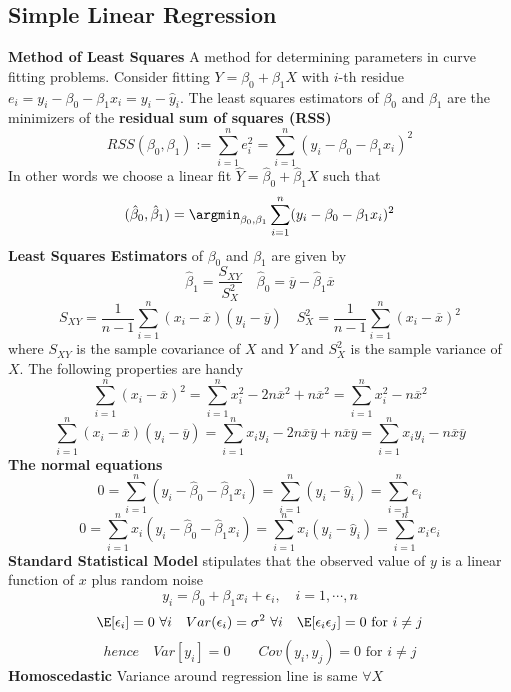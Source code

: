 \documentclass[8pt]{article}
\begin{document}
\begin{multicols}{3}
{   \subsection*{Simple Linear Regression}
   \textbf{Method of Least Squares} A method for determining parameters in curve fitting problems. Consider fitting $Y = \beta_0 + \beta_1 X$ with $i$-th residue $e_i = y_i - \beta_0 - \beta_1 x_i = y_i - \hat{y}_i$. The least squares estimators of $\beta_0$ and $\beta_1$ are the minimizers of the \textbf{residual sum of squares (RSS)}
   \[
     RSS(\beta_0, \beta_1) := \sum_{i=1}^n e_i^2 = \sum_{i=1}^n (y_i - \beta_0 - \beta_1 x_i)^2
    \]
    In other words we choose a linear fit $\hat{Y} = \hat{\beta}_0 + \hat{\beta}_1 X$ such that
    \[
     (\hat{\beta}_0 ,\hat{\beta}_1) = \argmin_{\beta_0, \beta_1} \sum_{i=1}^n (y_i - \beta_0 - \beta_1 x_i)^2
    \]
    \textbf{Least Squares Estimators} of $\beta_0$ and $\beta_1$ are given by
    \[
      \hat{\beta}_1 = \frac{S_{XY}}{S_X^2} \quad \hat{\beta}_0 = \overline{y} - \hat{\beta}_1 \overline{x}
    \]
    \[
      S_{XY} = \frac{1}{n-1} \sum_{i=1}^n (x_i - \overline{x})(y_i - \overline{y}) \quad S_X^2 = \frac{1}{n-1}\sum_{i=1}^{n}(x_i - \overline{x})^2
    \]
    where $S_{XY}$ is the sample covariance of $X$ and $Y$ and $S_X^2$ is the sample variance of $X$. The following properties are handy
    \[
      \sum_{i=1}^n (x_i - \overline{x})^2 = \sum_{i=1}^n x_i^2 - 2n\overline{x}^2 + n\overline{x}^2= \sum_{i=1}^n x_i^2 - n\overline{x}^2
    \]
    \[
      \sum_{i=1}^n (x_i - \overline{x})(y_i - \overline{y}) = \sum_{i=1}^n x_iy_i - 2n\overline{x}\overline{y} + n\overline{x}\overline{y} =\sum_{i=1}^n x_iy_i - n\overline{x}\overline{y}
    \]
    \textbf{The normal equations}
    \[
      0 = \sum_{i=1}^n (y_i - \hat{\beta}_0 - \hat{\beta}_1 x_i) = \sum_{i=1}^n (y_i - \hat{y}_i) = \sum_{i=1}^n e_i
    \]
    \[
      0 = \sum_{i=1}^n x_i (y_i - \hat{\beta}_0 - \hat{\beta}_1 x_i) = \sum_{i=1}^n x_i (y_i - \hat{y}_i) = \sum_{i=1}^n x_i e_i
    \]
    \textbf{Standard Statistical Model} stipulates that the observed value of $y$ is a linear function of $x$ plus random noise
    \[
      y_i = \beta_0 + \beta_1 x_i + \epsilon_i, \quad i = 1, \cdots, n
    \]
    \[
      \E[\epsilon_i] = 0 \text{ } \forall i  \quad Var(\epsilon_i) = \sigma^2 \text{ } \forall i \quad \E[\epsilon_i \epsilon_j] = 0 \text{ for } i\neq j
    \]
    \[
      hence \quad Var[y_i] = 0 \quad \quad Cov(y_i, y_j) = 0 \text{ for } i\neq j
    \]
    \textbf{Homoscedastic} Variance around regression line is same $\forall X$\\
}
\end{multicols}
\end{document}
